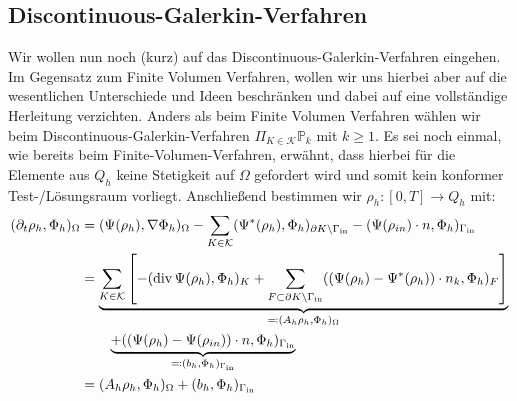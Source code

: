 \subsection{Discontinuous-Galerkin-Verfahren}
Wir wollen nun noch (kurz) auf das Discontinuous-Galerkin-Verfahren eingehen. Im Gegensatz zum Finite Volumen Verfahren, wollen wir uns hierbei aber auf die wesentlichen Unterschiede und Ideen beschränken und dabei auf eine vollständige Herleitung verzichten. \newline
Anders als beim Finite Volumen Verfahren wählen wir beim Discontinuous-Galerkin-Verfahren $\Pi_{K\in\mathcal{K}} \mathbb{P}_k $ mit $ k \geq 1 $. Es sei noch einmal, wie bereits beim Finite-Volumen-Verfahren, erwähnt, dass hierbei für die Elemente aus $Q_h$ keine Stetigkeit auf $\Omega$ gefordert wird und somit kein konformer Test-/Lösungsraum vorliegt. \newline
Anschließend bestimmen wir $\rho_h : [0,T] \rightarrow Q_h$ mit:
	\begin{align*}
		(\partial_t \rho_h , \Phi_h)_{\Omega} &= (\Psi(\rho_h),\nabla \Phi_h)_{\Omega}
		- \sum_{K \in \mathcal{K}}(\Psi^*(\rho_h),\Phi_h)_{\partial K \setminus \Gamma_{{\text{in}}}}
		-(\Psi(\rho_{in}) \cdot n ,\Phi_h)_{\Gamma_{{\text{in}}}} \\
		&= \underbrace{\sum_{K \in \mathcal{K}} \left[ -( \operatorname{div} \Psi (\rho_h),\Phi_h)_{K}
		+ \sum_{ F \subset \partial K \setminus \Gamma_{{\text{in}}}} ((\Psi(\rho_h)-\Psi ^* (\rho_h)) \cdot n_k , \Phi_h)_F \right]}_{\eqqcolon  (A_h \rho_h, \Phi_h )_{\Omega}} \\		
		&\qquad \underbrace{ +( (\Psi(\rho_h) - \Psi(\rho_{in})) \cdot n,\Phi_h)_{\Gamma_{{\text{in}}}}}_{\eqqcolon(b_h,\Phi_h)_{\Gamma_{{\text{in}}}}}
		 \\
		&= (A_h \rho_h, \Phi_h )_{\Omega} + (b_h,\Phi_h)_{\Gamma_{{\text{in}}}}
	\end{align*}  
